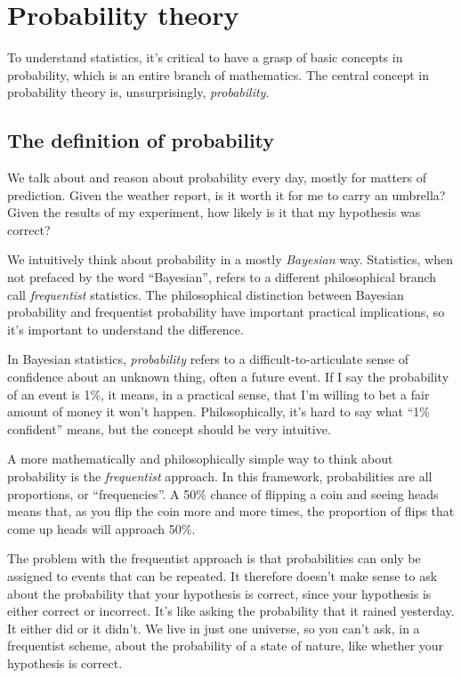 
\chapter{Probability theory}

To understand statistics, it's critical to have a grasp of basic concepts in
probability, which is an entire branch of mathematics. The central concept in
probability theory is, unsurprisingly, \emph{probability}.

\section{The definition of probability}

We talk about and reason about probability every day, mostly for matters of
prediction. Given the weather report, is it worth it for me to carry an
umbrella? Given the results of my experiment, how likely is it that my
hypothesis was correct?

We intuitively think about probability in a mostly \emph{Bayesian} way.
Statistics, when not prefaced by the word ``Bayesian'', refers to a different
philosophical branch call \emph{frequentist} statistics. The philosophical
distinction between Bayesian probability and frequentist probability have
important practical implications, so it's important to understand the
difference.

In Bayesian statistics, \emph{probability} refers to a difficult-to-articulate
sense of confidence about an unknown thing, often a future event. If I say the
probability of an event is 1\%, it means, in a practical sense, that I'm
willing to bet a fair amount of money it won't happen. Philosophically, it's
hard to say what ``1\% confident'' means, but the concept should be very
intuitive.

A more mathematically and philosophically simple way to think about
probability is the \emph{frequentist} approach. In this framework,
probabilities are all proportions, or ``frequencies''. A 50\% chance of
flipping a coin and seeing heads means that, as you flip the coin more and
more times, the proportion of flips that come up heads will approach 50\%.

The problem with the frequentist approach is that probabilities can only be
assigned to events that can be repeated. It therefore doesn't make sense to
ask about the probability that your hypothesis is correct, since your
hypothesis is either correct or incorrect. It's like asking the probability
that it rained yesterday. It either did or it didn't. We live in just one
universe, so you can't ask, in a frequentist scheme, about the probability of
a state of nature, like whether your hypothesis is correct.

